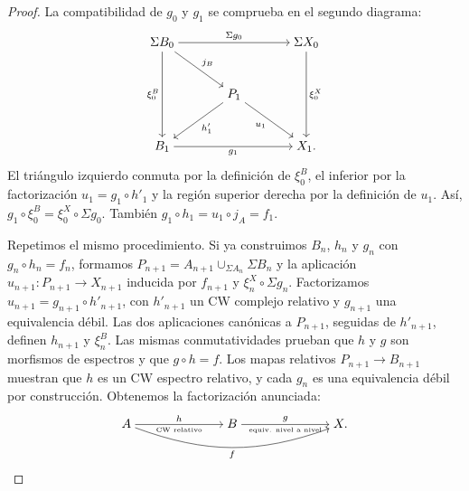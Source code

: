 \begin{proof}
La compatibilidad de $g_0$ y $g_1$ se comprueba en el segundo diagrama:
\[
\begin{tikzcd}[cramped,column sep=large,row sep=large]
\Sigma B_0 \arrow[rr,"\Sigma g_0"] \arrow[dd,"\xi^B_0"']
\arrow[dr,"j_B"] && \Sigma X_0 \arrow[dd,"\xi^X_0"]\\
& P_1 \arrow[dl,"h'_1"] \arrow[dr,"u_1"'] &\\
B_1 \arrow[rr,"g_1"'] && X_1.
\end{tikzcd}
\]
El triángulo izquierdo conmuta por la definición de $\xi^B_0$, el inferior por la factorización $u_1=g_1\circ h'_1$ y la región superior derecha por la definición de $u_1$. Así, $g_1\circ\xi^B_0=\xi^X_0\circ\Sigma g_0$. También $g_1\circ h_1=u_1\circ j_A=f_1$.

Repetimos el mismo procedimiento. Si ya construimos $B_n$, $h_n$ y $g_n$ con $g_n\circ h_n=f_n$, formamos $P_{n+1}=A_{n+1}\cup_{\Sigma A_n}\Sigma B_n$ y la aplicación $u_{n+1}\colon P_{n+1}\to X_{n+1}$ inducida por $f_{n+1}$ y $\xi^X_n\circ\Sigma g_n$. Factorizamos $u_{n+1}=g_{n+1}\circ h'_{n+1}$, con $h'_{n+1}$ un CW complejo relativo y $g_{n+1}$ una equivalencia débil. Las dos aplicaciones canónicas a $P_{n+1}$, seguidas de $h'_{n+1}$, definen $h_{n+1}$ y $\xi^B_n$. Las mismas conmutatividades prueban que $h$ y $g$ son morfismos de espectros y que $g\circ h=f$. Los mapas relativos $P_{n+1}\to B_{n+1}$ muestran que $h$ es un CW espectro relativo, y cada $g_n$ es una equivalencia débil por construcción. Obtenemos la factorización anunciada:
\[
\begin{tikzcd}[cramped,column sep=7em]
A \arrow[r,"h","\text{\tiny{CW relativo}}"']
\arrow[rr,bend right=20,"f"']
& B \arrow[r,"g","\text{\tiny{equiv. nivel a nivel}}"'] & X.
\end{tikzcd}
\]
\end{proof}

